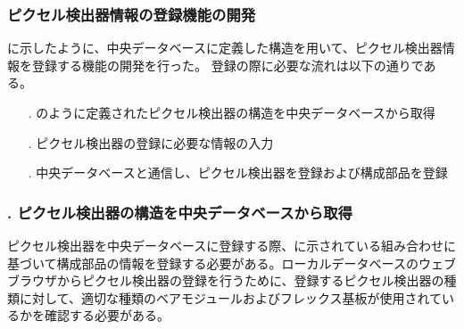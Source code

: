 

\subsubsection{ピクセル検出器情報の登録機能の開発}
\label{sec:register-module}

に示したように、中央データベースに定義した構造を用いて、ピクセル検出器情報を登録する機能の開発を行った。
登録の際に必要な流れは以下の通りである。
\begin{itemize}
  \item[\rnum{1}. ] のように定義されたピクセル検出器の構造を中央データベースから取得
  \item[\rnum{2}. ] ピクセル検出器の登録に必要な情報の入力
  \item[\rnum{3}. ] 中央データベースと通信し、ピクセル検出器を登録および構成部品を登録
\end{itemize}

\subsubsection{. ピクセル検出器の構造を中央データベースから取得}

ピクセル検出器を中央データベースに登録する際、に示されている組み合わせに基づいて構成部品の情報を登録する必要がある。ローカルデータベースのウェブブラウザからピクセル検出器の登録を行うために、登録するピクセル検出器の種類に対して、適切な種類のベアモジュールおよびフレックス基板が使用されているかを確認する必要がある。

